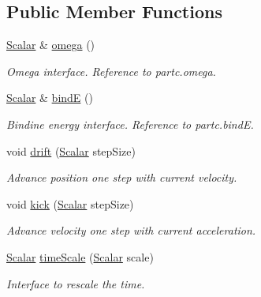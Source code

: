 \subsection*{Public Member Functions}
\begin{DoxyCompactItemize}
\item 
\mbox{\hyperlink{class_regu_system_afa2cfdbfed4cc8fa879ca715c78ff240}{Scalar}} \& \mbox{\hyperlink{class_regu_system_aec2d17af65cb81385adfd77eba8122c0}{omega}} ()
\begin{DoxyCompactList}\small\item\em Omega interface. Reference to partc.\+omega. \end{DoxyCompactList}\item 
\mbox{\hyperlink{class_regu_system_afa2cfdbfed4cc8fa879ca715c78ff240}{Scalar}} \& \mbox{\hyperlink{class_regu_system_a6bf4ceaf04e7f86c737c2586a8657ff6}{bindE}} ()
\begin{DoxyCompactList}\small\item\em Bindine energy interface. Reference to partc.\+bindE. \end{DoxyCompactList}\item 
void \mbox{\hyperlink{class_regu_system_aa7566794cc669e07eff8f42cfafee6c2}{drift}} (\mbox{\hyperlink{class_regu_system_afa2cfdbfed4cc8fa879ca715c78ff240}{Scalar}} step\+Size)
\begin{DoxyCompactList}\small\item\em Advance position one step with current velocity. \end{DoxyCompactList}\item 
void \mbox{\hyperlink{class_regu_system_aec4eb60d2fe97652cef662db9e8b730f}{kick}} (\mbox{\hyperlink{class_regu_system_afa2cfdbfed4cc8fa879ca715c78ff240}{Scalar}} step\+Size)
\begin{DoxyCompactList}\small\item\em Advance velocity one step with current acceleration. \end{DoxyCompactList}\item 
\mbox{\hyperlink{class_regu_system_afa2cfdbfed4cc8fa879ca715c78ff240}{Scalar}} \mbox{\hyperlink{class_regu_system_ac6d3e3cac21890f0af114f364f853cda}{time\+Scale}} (\mbox{\hyperlink{class_regu_system_afa2cfdbfed4cc8fa879ca715c78ff240}{Scalar}} scale)
\begin{DoxyCompactList}\small\item\em Interface to rescale the time. \end{DoxyCompactList}\end{DoxyCompactItemize}
